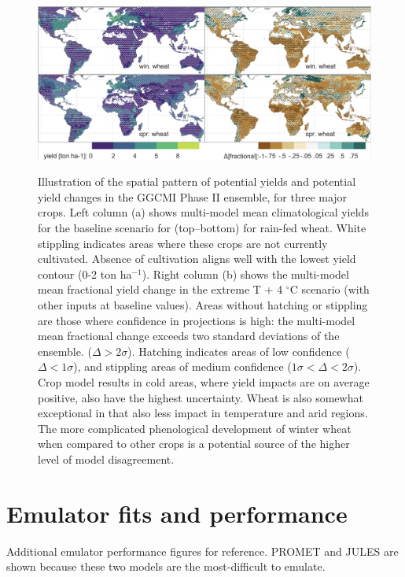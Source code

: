 \documentclass[10pt]{article}
\begin{document}
\begin{figure}[h!]
\includegraphics[width=\textwidth]{s_wheat_baseline.png}\\
\caption{Illustration of the spatial pattern of potential yields and potential yield changes in the GGCMI Phase II ensemble, for three major crops. Left column (a) shows multi-model mean climatological yields for the baseline scenario for (top--bottom) for rain-fed wheat. White stippling indicates areas where these crops are not currently cultivated. Absence of cultivation aligns well with the lowest yield contour (0-2 ton ha$^{-1}$). Right column (b) shows the multi-model mean fractional yield change in the extreme T + 4 $^{\circ}$C scenario (with other inputs at baseline values). Areas without hatching or stippling are those where confidence in projections is high: the multi-model mean fractional change exceeds two standard deviations of the ensemble. ($\Delta > 2\sigma$). Hatching indicates areas of low confidence ($\Delta < 1 \sigma$), and stippling areas of medium confidence ($1 \sigma < \Delta < 2 \sigma$). Crop model results in cold areas, where yield impacts are on average positive, also have the highest uncertainty. Wheat is also somewhat exceptional in that  also less impact in temperature and arid regions. The more complicated phenological development of winter wheat when compared to other crops is a potential source of the higher level of model disagreement.}
\label{fig:wheatbaseline}
\end{figure}

\clearpage
\section{Emulator fits and performance}
Additional emulator performance figures for reference. PROMET and JULES are shown because these two models are the most-difficult to emulate.
\end{document}
